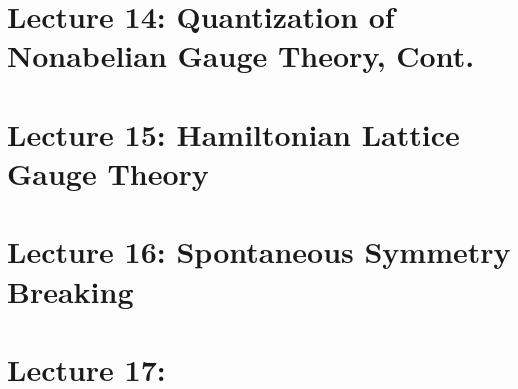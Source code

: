 \documentclass[10pt]{article}
\begin{document}


\clearpage

\section*{Lecture 14: Quantization of Nonabelian Gauge Theory, Cont.}
\label{sec: lec14}



\clearpage

\section*{Lecture 15: Hamiltonian Lattice Gauge Theory}
\label{sec: lec15}



\clearpage

\section*{Lecture 16: Spontaneous Symmetry Breaking}
\label{sec: lec16}



\clearpage

\section*{Lecture 17: }
\label{sec: lec17}

%

\end{document}
